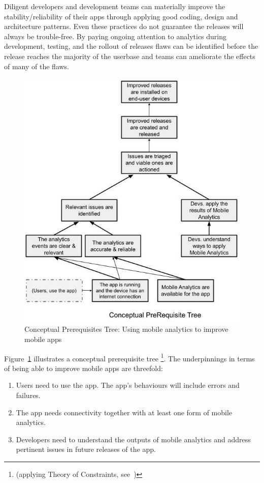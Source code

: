 Diligent developers and development teams can materially improve the stability/reliability of their apps through applying good coding, design and architecture patterns. Even these practices do not guarantee the releases will always be trouble-free. By paying ongoing attention to analytics during development, testing, and the rollout of releases flaws can be identified before the release reaches the majority of the userbase and teams can ameliorate the effects of many of the flaws.

\newpage 

\begin{figure}
    \centering
    \includegraphics[width=12.5cm]{images/my/Conceptual_prereq_tree_Applying_Theory_of_Constraints_to_using_Mobile_Analytics_to_improve_Mobile_Apps.jpeg}
    \caption{Conceptual Prerequisites Tree: Using mobile analytics to improve mobile apps}
    \label{fig:using-toc-cpt-using-mobile-analytics-to-improve-mobile-apps}
\end{figure}

Figure~\ref{fig:using-toc-cpt-using-mobile-analytics-to-improve-mobile-apps} illustrates a conceptual prerequisite tree \footnote{(applying Theory of Constraints, see~\citep{goldratt2017_necessary_but_not_sufficient, lepore1999_deming_and_goldratt, scheinkopf1999_thinking_for_a_change})}. 
%
The underpinnings in terms of being able to improve mobile apps are threefold: 
\begin{enumerate}
    \item Users need to use the app. The app's behaviours will include errors and failures.
    \item The app needs connectivity together with at least one form of mobile analytics.
    \item Developers need to understand the outputs of mobile analytics and address pertinent issues in future releases of the app.
\end{enumerate}

